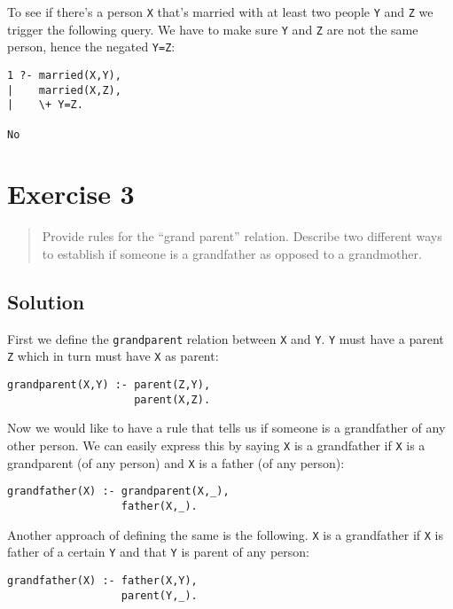 \documentclass[11pt]{article}
\begin{document}
To see if there's a person \verb|X| that's married with at least two people \verb|Y| and \verb|Z| we trigger the following query. We have to make sure \verb|Y| and \verb|Z| are not the same person, hence the negated \verb|Y=Z|:

\begin{verbatim}
1 ?- married(X,Y),
|    married(X,Z),
|    \+ Y=Z.

No
\end{verbatim}

\newpage

\section{Exercise 3}

\begin{quote}
Provide rules for the ``grand parent'' relation. Describe two different ways to establish if someone is a grandfather as opposed to a grandmother.
\end{quote}

\subsection*{Solution}

First we define the \verb|grandparent| relation between \verb|X| and \verb|Y|. \verb|Y| must have a parent \verb|Z| which in turn must have \verb|X| as parent:

\begin{verbatim}
grandparent(X,Y) :- parent(Z,Y),
                    parent(X,Z).
\end{verbatim}

Now we would like to have a rule that tells us if someone is a grandfather of any other person. We can easily express this by saying \verb|X| is a grandfather if \verb|X| is a grandparent (of any person) and \verb|X| is a father (of any person):

\begin{verbatim}
grandfather(X) :- grandparent(X,_),
                  father(X,_).
\end{verbatim}

Another approach of defining the same is the following. \verb|X| is a grandfather if \verb|X| is father of a certain \verb|Y| and that \verb|Y| is parent of any person:

\begin{verbatim}
grandfather(X) :- father(X,Y),
                  parent(Y,_).
\end{verbatim}
\end{document}
